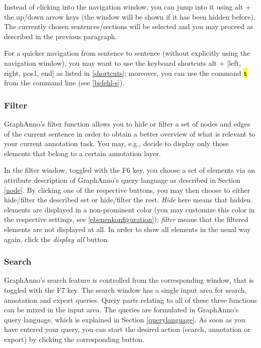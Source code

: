 \documentclass[12pt]{scrartcl}
\newcommand{\code}[1]{\hl{\texttt{#1}}}
\begin{document}
Instead of clicking into the navigation window, you can jump into it using alt + the up/down arrow keys (the window will be shown if it has been hidden before).
The currently chosen sentences/sections will be selected and you may proceed as described in the previous paragraph.

For a quicker navigation from sentence to sentence (without explicitly using the navigation window), you may want to use the keyboard shortcuts alt + [left, right, pos1, end] as listed in \ref{shortcuts}; moreover, you can use the command \code{s} from the command line (see \ref{befehl-s}).

\subsubsection{Filter}

GraphAnno’s filter function allows you to hide or filter a set of nodes and edges of the current sentence in order to obtain a better overview of what is relevant to your current annotation task.
You may, e.g., decide to display only those elements that belong to a certain annotation layer.

In the filter window, toggled with the F6 key, you choose a set of elements via an attribute description of GraphAnno’s query language as described in Section \ref{node}.
By clicking one of the respective buttons, you may then choose to either hide/filter the described set or hide/filter the rest.
\textit{Hide} here means that hidden elements are displayed in a non-prominent color (you may customize this color in the respective settings, see \ref{ebenenkonfiguration}); \textit{filter} means that the filtered elements are not displayed at all.
In order to show all elements in the usual way again, click the \textit{display all} button.

\subsubsection{Search}\label{window-search}

GraphAnno’s search feature is controlled from the corresponding window, that is toggled with the F7 key.
The search window has a single input area for search, annotation and export queries.
Query parts relating to all of these three functions can be mixed in the input area.
The queries are formulated in GraphAnno’s query language, which is explained in Section \ref{querylanguage}.
As soon as you have entered your query, you can start the desired action (search, annotation or export) by clicking the corresponding button.
\end{document}
